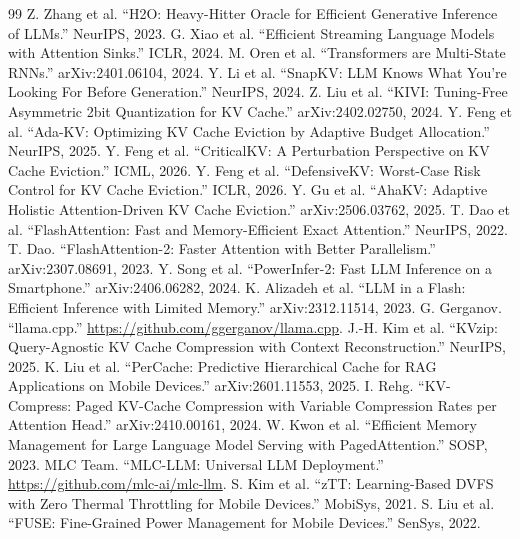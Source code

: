 \documentclass[sigconf, anonymous=false, screen=true]{acmart}
\begin{document}
\begin{thebibliography}{99}
\small
{} Z. Zhang et al. ``H2O: Heavy-Hitter Oracle for Efficient Generative Inference of LLMs.'' NeurIPS, 2023.
 G. Xiao et al. ``Efficient Streaming Language Models with Attention Sinks.'' ICLR, 2024.
 M. Oren et al. ``Transformers are Multi-State RNNs.'' arXiv:2401.06104, 2024.
 Y. Li et al. ``SnapKV: LLM Knows What You're Looking For Before Generation.'' NeurIPS, 2024.
 Z. Liu et al. ``KIVI: Tuning-Free Asymmetric 2bit Quantization for KV Cache.'' arXiv:2402.02750, 2024.
 Y. Feng et al. ``Ada-KV: Optimizing KV Cache Eviction by Adaptive Budget Allocation.'' NeurIPS, 2025.
 Y. Feng et al. ``CriticalKV: A Perturbation Perspective on KV Cache Eviction.'' ICML, 2026.
 Y. Feng et al. ``DefensiveKV: Worst-Case Risk Control for KV Cache Eviction.'' ICLR, 2026.
 Y. Gu et al. ``AhaKV: Adaptive Holistic Attention-Driven KV Cache Eviction.'' arXiv:2506.03762, 2025.
 T. Dao et al. ``FlashAttention: Fast and Memory-Efficient Exact Attention.'' NeurIPS, 2022.
 T. Dao. ``FlashAttention-2: Faster Attention with Better Parallelism.'' arXiv:2307.08691, 2023.
 Y. Song et al. ``PowerInfer-2: Fast LLM Inference on a Smartphone.'' arXiv:2406.06282, 2024.
 K. Alizadeh et al. ``LLM in a Flash: Efficient Inference with Limited Memory.'' arXiv:2312.11514, 2023.
 G. Gerganov. ``llama.cpp.'' \url{https://github.com/ggerganov/llama.cpp}.
 J.-H. Kim et al. ``KVzip: Query-Agnostic KV Cache Compression with Context Reconstruction.'' NeurIPS, 2025.
 K. Liu et al. ``PerCache: Predictive Hierarchical Cache for RAG Applications on Mobile Devices.'' arXiv:2601.11553, 2025.
 I. Rehg. ``KV-Compress: Paged KV-Cache Compression with Variable Compression Rates per Attention Head.'' arXiv:2410.00161, 2024.
 W. Kwon et al. ``Efficient Memory Management for Large Language Model Serving with PagedAttention.'' SOSP, 2023.
 MLC Team. ``MLC-LLM: Universal LLM Deployment.'' \url{https://github.com/mlc-ai/mlc-llm}.
 S. Kim et al. ``zTT: Learning-Based DVFS with Zero Thermal Throttling for Mobile Devices.'' MobiSys, 2021.
 S. Liu et al. ``FUSE: Fine-Grained Power Management for Mobile Devices.'' SenSys, 2022.

\end{thebibliography}
\end{document}
